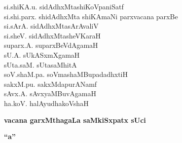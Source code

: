 {\begin{multicols}{2}
\begin{tabbing}
si.shiKA.u. \> sidAdhxMtashiKoVpaniSatf\\[2pt]
si.shi.parx. \> shidAdhxMta shiKAmaNi parxvacana parxBe\\[2pt]
si.sArA. \> sidAdhxMtasArAvaliV\\[2pt]
si.sheV. \> sidAdhxMtasheVKaraH\\[2pt]
suparx.A. \> suparxBeVdAgamaH\\[2pt]
sU.A. \> sUkASxmXgamaH\\[2pt]
sUta.saM. \> sUtasaMhitA\\[2pt]
soV.shaM.pa. \> soVmashaMBupadadhxtiH\\[2pt]
sakxM.pu. \> sakxMdapurANamf\\[2pt]
sAvx.A. \> sAvxyaMBuvAgamaH\\[2pt]
ha.koV. \> halAyudhakoVshaH
\end{tabbing}
\end{multicols}
}


\vskip 1cm

\begin{center}
{\Large\bf vacana garxMthagaLa saMkiSxpatx sUci}
\end{center}

\centerline{\bf ``a''}

